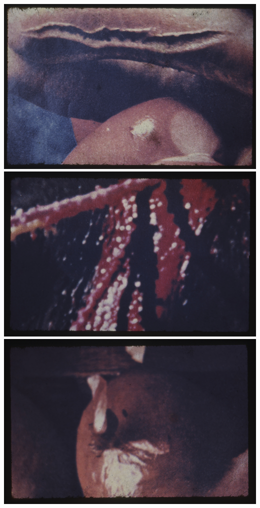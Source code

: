 \includegraphics[width=\columnwidth]{media/IMAGEM35.jpg}
\includegraphics[width=\columnwidth]{media/IMAGEM36.jpg}
\includegraphics[width=\columnwidth]{media/IMAGEM37.jpg}


